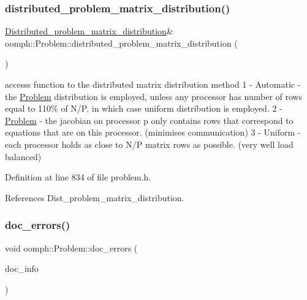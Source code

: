 \subsubsection{\texorpdfstring{distributed\+\_\+problem\+\_\+matrix\+\_\+distribution()}{distributed\_problem\_matrix\_distribution()}}
{\footnotesize\ttfamily \hyperlink{classoomph_1_1Problem_a8fc1f40f2a9309e9ff02772fa2258402}{Distributed\+\_\+problem\+\_\+matrix\+\_\+distribution}\& oomph\+::\+Problem\+::distributed\+\_\+problem\+\_\+matrix\+\_\+distribution (\begin{DoxyParamCaption}{ }\end{DoxyParamCaption})\hspace{0.3cm}{\ttfamily [inline]}}



accesss function to the distributed matrix distribution method 1 -\/ Automatic -\/ the \hyperlink{classoomph_1_1Problem}{Problem} distribution is employed, unless any processor has number of rows equal to 110\% of N/P, in which case uniform distribution is employed. 2 -\/ \hyperlink{classoomph_1_1Problem}{Problem} -\/ the jacobian on processor p only contains rows that correspond to equations that are on this processor. (minimises communication) 3 -\/ Uniform -\/ each processor holds as close to N/P matrix rows as possible. (very well load balanced) 



Definition at line 834 of file problem.\+h.



References Dist\+\_\+problem\+\_\+matrix\+\_\+distribution.

\mbox{\label{classoomph_1_1Problem_af2a77519885ccb13e4644c89b19c37a7}} 
\subsubsection{\texorpdfstring{doc\+\_\+errors()}{doc\_errors()}\hspace{0.1cm}{\footnotesize\ttfamily [1/2]}}
{\footnotesize\ttfamily void oomph\+::\+Problem\+::doc\+\_\+errors (\begin{DoxyParamCaption}\item[{\hyperlink{classoomph_1_1DocInfo}{Doc\+Info} \&}]{doc\+\_\+info }\end{DoxyParamCaption})}



